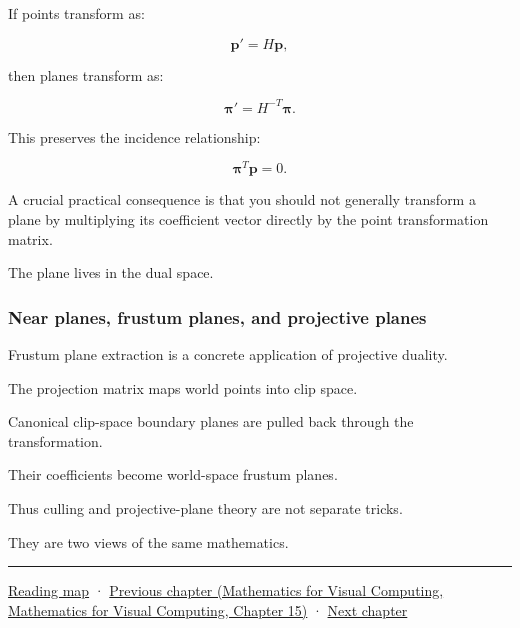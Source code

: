 If points transform as:

\[
 \mathbf p'=H\mathbf p,
\]

then planes transform as:

\[
 \boxed{ \boldsymbol\pi'=H^{-T}\boldsymbol\pi }.
\]

This preserves the incidence relationship:

\[
 \boldsymbol\pi^T\mathbf p=0.
\]

A crucial practical consequence is that you should not generally transform a plane by multiplying its coefficient vector directly by the point transformation matrix.

The plane lives in the dual space.

\subsubsection{Near planes, frustum planes, and projective planes}\label{02-foundations-ii-ch032-near-planes-frustum-planes-and-projective-planes}

Frustum plane extraction is a concrete application of projective duality.

The projection matrix maps world points into clip space.

Canonical clip-space boundary planes are pulled back through the transformation.

Their coefficients become world-space frustum planes.

Thus culling and projective-plane theory are not separate tricks.

They are two views of the same mathematics.

\begin{center}\rule{0.5\linewidth}{0.5pt}\end{center}

\hyperref[volume-reading-map]{Reading map} · \href{../02-Mathematics-for-Visual-Computing/main.pdf\#nameddest=02-foundations-ii-ch031-implement-probability-with-numerical-contracts}{Previous chapter (Mathematics for Visual Computing, Mathematics for Visual Computing, Chapter 15)} · \hyperref[02-foundations-ii-ch033-projection-clipping-and-raster-sampling]{Next chapter}
